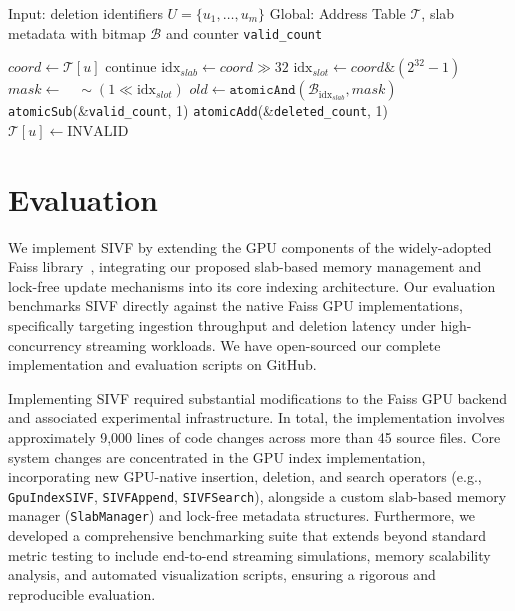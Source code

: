 \documentclass[sigconf,nonacm]{acmart}
\newcommand{\don}[1]{\textcolor{blue}{[Dongfang: #1]}}
\theoremstyle{plain}
\theoremstyle{definition}
\theoremstyle{remark}
\begin{document}
\begin{algorithm}[t]
\caption{Bitmap-based lazy eviction in SIVF}
\label{alg:sivf_delete}
\begin{algorithmic}[1]
\State Input: deletion identifiers $U=\{u_1,\ldots,u_m\}$
\State Global: Address Table $\mathcal{T}$, slab metadata with bitmap $\mathcal{B}$ and counter \texttt{valid\_count}

    \State $coord \gets \mathcal{T}[u]$
     \State continue \EndIf
    \State $\text{idx}_{slab} \gets coord \gg 32$
    \State $\text{idx}_{slot} \gets coord \mathbin{\&} (2^{32}-1)$
    \State $mask \gets \quad \sim(1 \ll \text{idx}_{slot})$
    \State $old \gets \texttt{atomicAnd}(\mathcal{B}_{\text{idx}_{slab}}, mask)$
        \State \texttt{atomicSub}(\&\texttt{valid\_count}, 1)
        \State \texttt{atomicAdd}(\&\texttt{deleted\_count}, 1)
        \State $\mathcal{T}[u] \gets \text{INVALID}$
    \EndIf
\EndFor
\end{algorithmic}
\end{algorithm}


\section{Evaluation}
\label{sec:evaluation}


We implement SIVF by extending the GPU components of the widely-adopted Faiss library~\cite{douze2024faiss}, integrating our proposed slab-based memory management and lock-free update mechanisms into its core indexing architecture. Our evaluation benchmarks SIVF directly against the native Faiss GPU implementations, specifically targeting ingestion throughput and deletion latency under high-concurrency streaming workloads. We have open-sourced our complete implementation and evaluation scripts on GitHub.

Implementing SIVF required substantial modifications to the Faiss GPU backend and associated experimental infrastructure. In total, the implementation involves approximately 9,000 lines of code changes across more than 45 source files. Core system changes are concentrated in the GPU index implementation, incorporating new GPU-native insertion, deletion, and search operators (e.g., \texttt{GpuIndexSIVF}, \texttt{SIVFAppend}, \texttt{SIVFSearch}), alongside a custom slab-based memory manager (\texttt{SlabManager}) and lock-free metadata structures. Furthermore, we developed a comprehensive benchmarking suite that extends beyond standard metric testing to include end-to-end streaming simulations, memory scalability analysis, and automated visualization scripts, ensuring a rigorous and reproducible evaluation.
\end{document}
